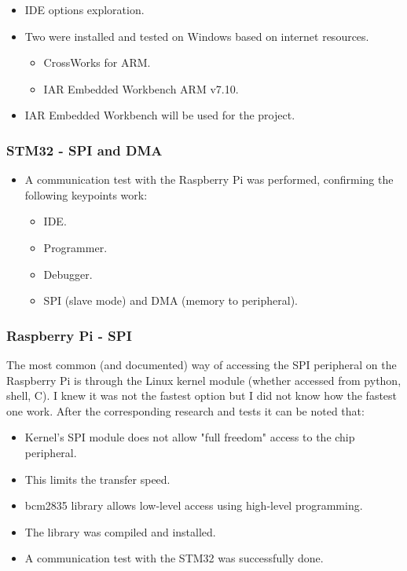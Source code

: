 \begin{itemize}
	\item IDE options exploration.
	\item Two were installed and tested on Windows based on internet resources.
	\begin{itemize}
		\item CrossWorks for ARM.
		\item IAR Embedded Workbench ARM v7.10.
	\end{itemize}
	\item IAR Embedded Workbench will be used for the project.
\end{itemize}


\subsubsection{STM32 - SPI and DMA}
\begin{itemize}
	\item A communication test with the Raspberry Pi was performed, confirming the following keypoints work:
	\begin{itemize}
		\item IDE.
		\item Programmer.
		\item Debugger.
		\item SPI (slave mode) and DMA (memory to peripheral).
	\end{itemize}
\end{itemize}



\subsubsection{Raspberry Pi - SPI}

The most common (and documented) way of accessing the SPI peripheral on the Raspberry Pi is through the Linux kernel module (whether accessed from python, shell, C). I knew it was not the fastest option but I did not know how the fastest one work. After the corresponding research and tests it can be noted that:

\begin{itemize}
	\item Kernel's SPI module does not allow "full freedom" access to the chip peripheral.
	\item This limits the transfer speed.
	\item bcm2835 library allows low-level access using high-level programming.
	\item The library was compiled and installed.
	\item A communication test with the STM32 was successfully done.
\end{itemize}

